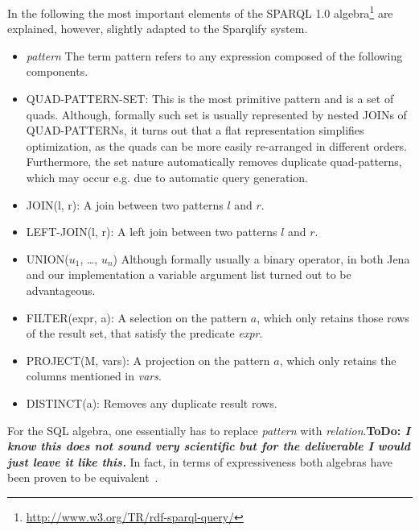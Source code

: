 \documentclass[a4paper,twoside,bibtotoc,abstracton,12pt,BCOR=15mm]{scrreprt}
\newcommand{\todo}[1]{\textbf{ToDo: \textit{#1}}}
\begin{document}
In the following the most important elements of the SPARQL 1.0 algebra\footnote{\url{http://www.w3.org/TR/rdf-sparql-query/}} are explained,
however, slightly adapted to the Sparqlify system.
\begin{itemize}
    \item \emph{pattern} The term pattern refers to any expression composed of the following components.
	\item QUAD-PATTERN-SET: This is the most primitive pattern and is a set of quads.
		Although, formally such set is usually represented by nested JOINs of QUAD-PATTERNs, it turns out that a
		flat representation simplifies optimization, as the quads can be more easily re-arranged in different orders.
		Furthermore, the set nature automatically removes duplicate quad-patterns, which may occur e.g. due to automatic query generation. 
	\item JOIN(l, r): A join between two patterns $l$ and $r$.
	\item LEFT-JOIN(l, r): A left join between two patterns $l$ and $r$.
	\item UNION($u_1$, \ldots, $u_n$) Although formally usually a binary operator, in both Jena and our implementation a variable argument list turned out to be advantageous.
	\item FILTER(expr, a): A selection on the pattern $a$, which only retains those rows of the result set, that satisfy the predicate \emph{expr}.
	\item PROJECT(M, vars): A projection on the pattern $a$, which only retains the columns mentioned in \emph{vars}.
	\item DISTINCT(a): Removes any duplicate result rows.
\end{itemize}
For the SQL algebra, one essentially has to replace \emph{pattern} with \emph{relation}.\todo{I know this does not sound very scientific but for the deliverable I would just leave it like this.}
In fact, in terms of expressiveness both algebras have been proven to be equivalent~\cite{sparqloverrelational}. 
\end{document}
